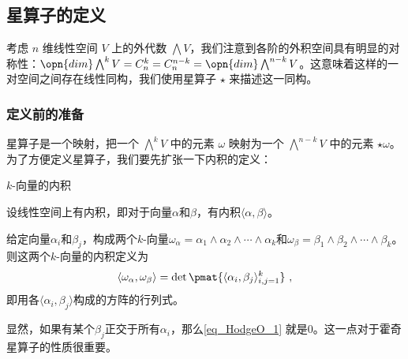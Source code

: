 


\subsection{星算子的定义}

考虑 $n$ 维线性空间 $V$ 上的外代数 $\bigwedge V$，我们注意到各阶的外积空间具有明显的对称性：$\opn{dim}\bigwedge^k V=C^k_n=C^{n-k}_n=\opn{dim}\bigwedge^{n-k} V$。这意味着这样的一对空间之间存在线性同构，我们使用星算子 $\star$ 来描述这一同构。


\subsubsection{定义前的准备}


星算子是一个映射，把一个 $\bigwedge^k V$ 中的元素 $\omega$ 映射为一个 $\bigwedge^{n-k} V$ 中的元素 $\star\omega$。为了方便定义星算子，我们要先扩张一下内积的定义：


\begin{definition}{$k$-向量的内积}\label{def_HodgeO_1}

设线性空间上有内积，即对于向量$\alpha$和$\beta$，有内积$\langle \alpha, \beta \rangle$。

给定向量$\alpha_i$和$\beta_j$，构成两个$k$-向量$\omega_\alpha=\alpha_1\wedge \alpha_2\wedge \cdots\wedge \alpha_k$和$\omega_\beta=\beta_1\wedge \beta_2\wedge \cdots\wedge \beta_k$。则这两个$k$-向量的内积定义为
\begin{equation}\label{eq_HodgeO_1}
\langle\omega_\alpha, \omega_\beta\rangle = \det \pmat{\langle \alpha_i, \beta_j \rangle_{i, j=1}^k}~,
\end{equation}
即用各$\langle \alpha_i, \beta_j \rangle$构成的方阵的行列式。

\end{definition}

显然，如果有某个$\beta_j$正交于所有$\alpha_i$，那么\autoref{eq_HodgeO_1} 就是$0$。这一点对于霍奇星算子的性质很重要。







